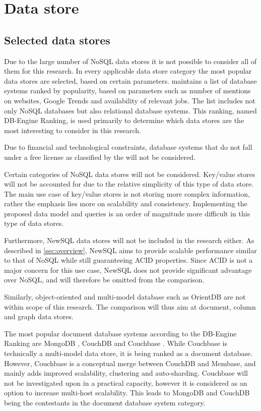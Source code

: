 \section{Data store}
\label{sec:data-store}

\subsection{Selected data stores}
\label{sec:selected-data-stores}

Due to the large number of NoSQL data stores it is not possible to consider all of them for this research. In every applicable data store category the most popular data stores are selected, based on certain parameters. \textcite{DBEngine2018} maintains a list of database systems ranked by popularity, based on parameters such as number of mentions on websites, Google Trends and availability of relevant jobs. The list includes not only NoSQL databases but also relational database systems. This ranking, named DB-Engine Ranking, is used primarily to determine which data stores are the most interesting to consider in this research.

Due to financial and technological constraints, database systems that do not fall under a free license as classified by the \textcite{FreeSoftwareFoundation1985} will not be considered.

Certain categories of NoSQL data stores will not be considered. Key/value stores will not be accounted for due to the relative simplicity of this type of data store. The main use case of key/value stores is not storing more complex information, rather the emphasis lies more on scalability and consistency. Implementing the proposed data model and queries is an order of magnitude more difficult in this type of data stores.

Furthermore, NewSQL data stores will not be included in the research either. As described in \cref{sec:overview}, NewSQL aims to provide scalable performance similar to that of NoSQL while still guaranteeing ACID properties. Since ACID is not a major concern for this use case, NewSQL does not provide significant advantage over NoSQL, and will therefore be omitted from the comparison.

Similarly, object-oriented and multi-model database such as OrientDB \autocite{OrientDB2010} are not within scope of this research. The comparison will thus aim at document, column and graph data stores.

The most popular document database systems according to the DB-Engine Ranking are MongoDB \autocite{MongoDB2009}, CouchDB \autocite{CouchDB2005} and Couchbase \autocite{Couchbase2010}. While Couchbase is technically a multi-model data store, it is being ranked as a document database. However, Couchbase is a conceptual merge between CouchDB and Membase, and mainly adds improved scalability, clustering and auto-sharding. Couchbase will not be investigated upon in a practical capacity, however it is considered as an option to increase multi-host scalability. This leads to MongoDB and CouchDB being the contestants in the document database system category.

